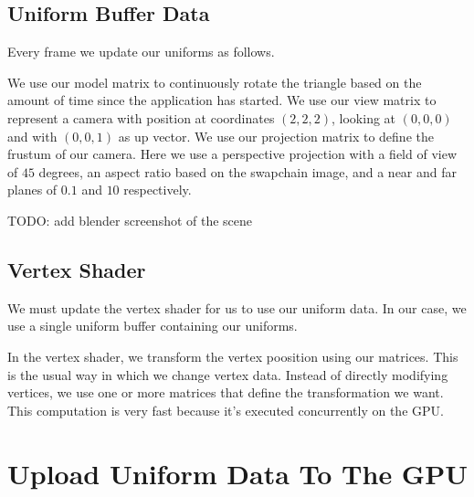 \subsection{Uniform Buffer Data}

Every frame we update our uniforms as follows.

\begin{minipage}{\linewidth}{\noindent}
    
\end{minipage}

We use our model matrix to continuously rotate the triangle based on the
amount of time since the application has started.
We use our view matrix to represent a camera with position at coordinates
$(2, 2, 2)$, looking at $(0, 0, 0)$ and with $(0, 0, 1)$ as up vector.
We use our projection matrix to define the frustum of our camera.
Here we use a perspective projection with a field of view of $45$ degrees,
an aspect ratio based on the swapchain image, and a near and far planes of
$0.1$ and $10$ respectively.

TODO: add blender screenshot of the scene

\subsection{Vertex Shader}

We must update the vertex shader for us to use our uniform data.
In our case, we use a single uniform buffer containing our uniforms.

\begin{minipage}{\linewidth}{\noindent}
    
\end{minipage}

In the vertex shader, we transform the vertex poosition using our matrices.
This is the usual way in which we change vertex data.
Instead of directly modifying vertices, we use one or more matrices
that define the transformation we want.
This computation is very fast because it's executed concurrently on the GPU.

\section{Upload Uniform Data To The GPU}

